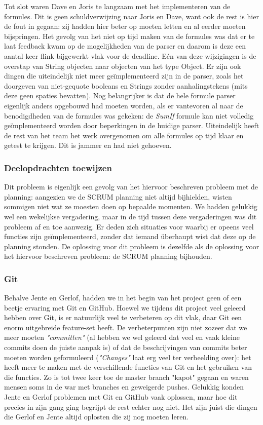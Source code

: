 \documentclass[a4paper,11pt]{article}
\begin{document}
Tot slot waren Dave en Joris te langzaam met het implementeren van de formules. Dit is geen schuldverwijzing naar Joris en Dave, want ook de rest is hier de fout in gegaan: zij hadden hier beter op moeten letten en al eerder moeten bijspringen. Het gevolg van het niet op tijd maken van de formules was dat er te laat feedback kwam op de mogelijkheden van de parser en daarom is deze een aantal keer flink bijgewerkt vlak voor de deadline. Eén van deze wijzigingen is de overstap van String objecten naar objecten van het type Object. Er zijn ook dingen die uiteindelijk niet meer geïmplementeerd zijn in de parser, zoals het doorgeven van niet-gequote booleans en Strings zonder aanhalingstekens (mits deze geen spaties bevatten). Nog belangrijker is dat de hele formule parser eigenlijk anders opgebouwd had moeten worden, als er vantevoren al naar de benodigdheden van de formules was gekeken: de \textit{SumIf} formule kan niet volledig geïmplementeerd worden door beperkingen in de huidige parser. Uiteindelijk heeft de rest van het team het werk overgenomen om alle formules op tijd klaar en getest te krijgen. Dit is jammer en had niet gehoeven.

\subsubsection{Deelopdrachten toewijzen}
Dit probleem is eigenlijk een gevolg van het hiervoor beschreven probleem met de planning: aangezien we de SCRUM planning niet altijd bijhielden, wisten sommigen niet wat ze moesten doen op bepaalde momenten. We hadden gelukkig wel een wekelijkse vergadering, maar in de tijd tussen deze vergaderingen was dit probleem af en toe aanwezig. Er deden zich situaties voor waarbij er opeens veel functies zijn ge\"{i}mplementeerd, zonder dat iemand überhaupt wist dat deze op de planning stonden. De oplossing voor dit probleem is dezelfde als de oplossing voor het hiervoor beschreven probleem: de SCRUM planning bijhouden.

\subsubsection{Git}
Behalve Jente en Gerlof, hadden we in het begin van het project geen of een beetje ervaring met Git en GitHub. Hoewel we tijdens dit project veel geleerd hebben over Git, is er natuurlijk veel te verbeteren op dit vlak, daar Git een enorm uitgebreide feature-set heeft. De verbeterpunten zijn niet zozeer dat we meer moeten \textit{"committen"} (al hebben we wel geleerd dat veel en vaak kleine commits doen de juiste aanpak is) of dat de beschrijvingen van commits beter moeten worden geformuleerd (\textit{"Changes"} laat erg veel ter verbeelding over): het heeft meer te maken met de verschillende functies van Git en het gebruiken van die functies. Zo is tot twee keer toe de master branch "kapot" gegaan en waren mensen soms in de war met branches en geweigerde pushes. Gelukkig konden Jente en Gerlof problemen met Git en GitHub vaak oplossen, maar hoe dit precies in zijn gang ging begrijpt de rest echter nog niet. Het zijn juist die
dingen die Gerlof en Jente altijd oplosten die zij nog moeten leren.
\end{document}
